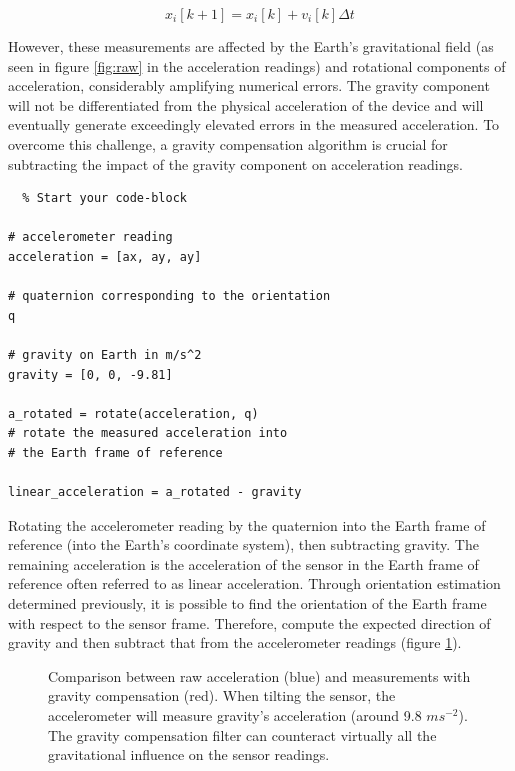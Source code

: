 \begin{equation}
    x_i[k+1]= x_i[k]+v_i[k]\Delta t
\end{equation}

However, these measurements are affected by the Earth's gravitational field (as seen in figure \ref{fig:raw} in the acceleration readings) and rotational components of acceleration, considerably amplifying numerical errors. The gravity component will not be differentiated from the physical acceleration of the device and will eventually generate exceedingly elevated errors in the measured acceleration. To overcome this challenge, a gravity compensation algorithm is crucial for subtracting the impact of the gravity component on acceleration readings.

\lstset{language=Python}
\begin{lstlisting}  % Start your code-block
    
# accelerometer reading
acceleration = [ax, ay, ay]  

# quaternion corresponding to the orientation
q                            

# gravity on Earth in m/s^2
gravity = [0, 0, -9.81]      

a_rotated = rotate(acceleration, q) 
# rotate the measured acceleration into
# the Earth frame of reference

linear_acceleration = a_rotated - gravity

\end{lstlisting}

Rotating the accelerometer reading by the quaternion into the Earth frame of reference (into the Earth's coordinate system), then subtracting gravity. The remaining acceleration is the acceleration of the sensor in the Earth frame of reference often referred to as linear acceleration. Through orientation estimation determined previously, it is possible to find the orientation of the Earth frame with respect to the sensor frame. Therefore, compute the expected direction of gravity and then subtract that from the accelerometer readings (figure \ref{fig:gavity_compensation}).

\begin{figure}[!h]
    \centering
    \resizebox{0.8\linewidth}{!}{}
    \caption{Comparison between raw acceleration (blue) and measurements with gravity compensation (red). When tilting the sensor, the accelerometer will measure gravity's acceleration (around 9.8 $ms^{-2}$). The gravity compensation filter can counteract virtually all the gravitational influence on the sensor readings.}
    \label{fig:gavity_compensation}
\end{figure}

